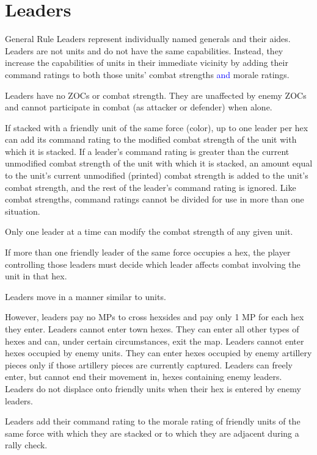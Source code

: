 \columnbreak
\section{Leaders}

\begin{rulebox}{General Rule}
  Leaders represent individually named generals and their aides. Leaders are not units and do not have the same capabilities. Instead, they increase the capabilities of units in their immediate vicinity by adding their command ratings to both those units' combat strengths \textcolor{blue}{and} morale ratings.
\end{rulebox}

 Leaders have no ZOCs or combat strength. They are unaffected by enemy ZOCs and cannot participate in combat (as attacker or defender) when alone.

If stacked with a friendly unit of the same force (color), up to one leader per hex can add its command rating to the modified combat strength of the unit with which it is stacked. If a leader's command rating is greater than the current unmodified combat strength of the unit with which it is stacked, an amount equal to the unit's current unmodified (printed) combat strength is added to the unit's combat strength, and the rest of the leader's command rating is ignored. Like combat strengths, command ratings cannot be divided for use in more than one situation.

 Only one leader at a time can modify the combat strength of any given unit.

If more than one friendly leader of the same force occupies a hex, the player controlling those leaders must decide which leader affects combat involving the unit in that hex.

 Leaders move in a manner similar to units.

However, leaders pay no MPs to cross hexsides and pay only 1 MP for each hex they enter. Leaders cannot enter town hexes. They can enter all other types of hexes and can, under certain circumstances, exit the map. Leaders cannot enter hexes occupied by enemy units. They can enter hexes occupied by enemy artillery pieces only if those artillery pieces are currently captured. Leaders can freely enter, but cannot end their movement in, hexes containing enemy leaders. Leaders do not displace onto friendly units when their hex is entered by enemy leaders.

 Leaders add their command rating to the morale rating of friendly units of the same force with which they are stacked or to which they are adjacent during a rally check.

